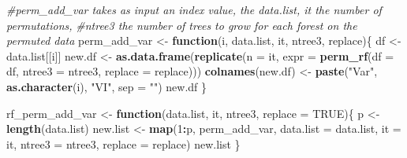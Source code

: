 \documentclass[12pt,twoside]{reedthesis}
\newenvironment{Shaded}{\begin{snugshade}}{\end{snugshade}}
\newcommand{\KeywordTok}[1]{\textcolor[rgb]{0.13,0.29,0.53}{\textbf{#1}}}
\newcommand{\DataTypeTok}[1]{\textcolor[rgb]{0.13,0.29,0.53}{#1}}
\newcommand{\DecValTok}[1]{\textcolor[rgb]{0.00,0.00,0.81}{#1}}
\newcommand{\StringTok}[1]{\textcolor[rgb]{0.31,0.60,0.02}{#1}}
\newcommand{\CommentTok}[1]{\textcolor[rgb]{0.56,0.35,0.01}{\textit{#1}}}
\newcommand{\OtherTok}[1]{\textcolor[rgb]{0.56,0.35,0.01}{#1}}
\newcommand{\ControlFlowTok}[1]{\textcolor[rgb]{0.13,0.29,0.53}{\textbf{#1}}}
\newcommand{\OperatorTok}[1]{\textcolor[rgb]{0.81,0.36,0.00}{\textbf{#1}}}
\newcommand{\NormalTok}[1]{#1}
\theoremstyle{definition}
\theoremstyle{definition}
\theoremstyle{definition}
\theoremstyle{remark}
\begin{document}
\begin{Shaded}
\begin{Highlighting}[]
{\CommentTok{#perm_add_var takes as input an index value, the data.list, it the number of permutations, }
\CommentTok{#ntree3 the number of trees to grow for each forest on the permuted data}
\NormalTok{perm_add_var <-}\StringTok{ }\ControlFlowTok{function}\NormalTok{(i, data.list, it, ntree3, replace)\{}
\NormalTok{  df <-}\StringTok{ }\NormalTok{data.list[[i]]}
\NormalTok{  new.df <-}\StringTok{ }\KeywordTok{as.data.frame}\NormalTok{(}\KeywordTok{replicate}\NormalTok{(}\DataTypeTok{n =}\NormalTok{ it, }\DataTypeTok{expr =} \KeywordTok{perm_rf}\NormalTok{(}\DataTypeTok{df =}\NormalTok{ df, }
                                                           \DataTypeTok{ntree3 =}\NormalTok{ ntree3, }\DataTypeTok{replace =}\NormalTok{ replace)))}
  \KeywordTok{colnames}\NormalTok{(new.df) <-}\StringTok{ }\KeywordTok{paste}\NormalTok{(}\StringTok{"Var"}\NormalTok{, }\KeywordTok{as.character}\NormalTok{(i), }\StringTok{"VI"}\NormalTok{, }\DataTypeTok{sep =} \StringTok{""}\NormalTok{)}
\NormalTok{  new.df}
\NormalTok{\}}

\NormalTok{rf_perm_add_var <-}\StringTok{ }\ControlFlowTok{function}\NormalTok{(data.list, it, ntree3, }\DataTypeTok{replace =} \OtherTok{TRUE}\NormalTok{)\{}
\NormalTok{  p <-}\StringTok{ }\KeywordTok{length}\NormalTok{(data.list)}
\NormalTok{  new.list <-}\StringTok{ }\KeywordTok{map}\NormalTok{(}\DecValTok{1}\OperatorTok{:}\NormalTok{p, perm_add_var, }\DataTypeTok{data.list =}\NormalTok{ data.list, }
      \DataTypeTok{it =}\NormalTok{ it, }\DataTypeTok{ntree3 =}\NormalTok{ ntree3, }\DataTypeTok{replace =}\NormalTok{ replace)}
\NormalTok{  new.list}
\NormalTok{\}}

}
\end{Highlighting}
\end{Shaded}
\end{document}
